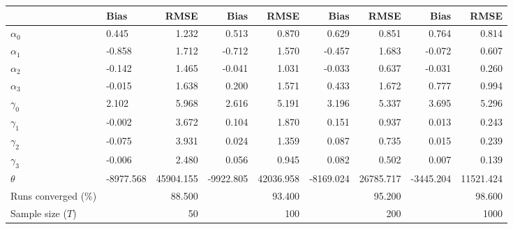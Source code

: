 
\begin{tabular}[t]{llrrrrrrr}
\toprule
  & Bias & RMSE & Bias & RMSE & Bias & RMSE & Bias & RMSE\\
\midrule
$\alpha_{0}$ & 0.445 & 1.232 & 0.513 & 0.870 & 0.629 & 0.851 & 0.764 & 0.814\\
$\alpha_{1}$ & -0.858 & 1.712 & -0.712 & 1.570 & -0.457 & 1.683 & -0.072 & 0.607\\
$\alpha_{2}$ & -0.142 & 1.465 & -0.041 & 1.031 & -0.033 & 0.637 & -0.031 & 0.260\\
$\alpha_{3}$ & -0.015 & 1.638 & 0.200 & 1.571 & 0.433 & 1.672 & 0.777 & 0.994\\
$\gamma_{0}$ & 2.102 & 5.968 & 2.616 & 5.191 & 3.196 & 5.337 & 3.695 & 5.296\\
$\gamma_{1}$ & -0.002 & 3.672 & 0.104 & 1.870 & 0.151 & 0.937 & 0.013 & 0.243\\
$\gamma_{2}$ & -0.075 & 3.931 & 0.024 & 1.359 & 0.087 & 0.735 & 0.015 & 0.239\\
$\gamma_{3}$ & -0.006 & 2.480 & 0.056 & 0.945 & 0.082 & 0.502 & 0.007 & 0.139\\
$\theta$ & -8977.568 & 45904.155 & -9922.805 & 42036.958 & -8169.024 & 26785.717 & -3445.204 & 11521.424\\
Runs converged (\%) &  & 88.500 &  & 93.400 &  & 95.200 &  & 98.600\\
Sample size ($T$) &  & 50 &  & 100 &  & 200 &  & 1000\\
\bottomrule
\end{tabular}
